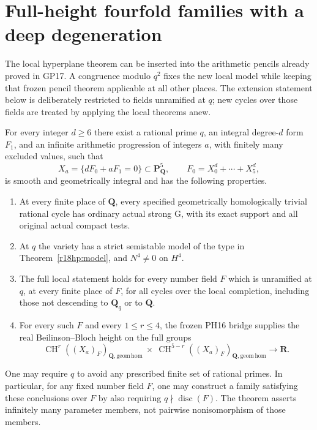 \section{Full-height fourfold families with a deep degeneration}
\label{r18gf:section}

The local hyperplane theorem can be inserted into the arithmetic
pencils already proved in GP17.  A congruence modulo $q^2$ fixes the
new local model while keeping that frozen pencil theorem applicable
at all other places.  The extension statement below is deliberately
restricted to fields unramified at $q$; new cycles over those fields
are treated by applying the local theorems anew.

\begin{theorem}
\label{r18gf:global}
For every integer $d\ge6$ there exist a rational prime $q$, an
integral degree-$d$ form $F_1$, and an infinite arithmetic progression
of integers $a$, with finitely many excluded values, such that
\[
 X_a=\{dF_0+aF_1=0\}\subset\mathbf P^5_{\mathbf Q},
 \qquad F_0=X_0^d+\cdots+X_5^d,
 \tag{GF18.1}\label{r18gf:family}
\]
is smooth and geometrically integral and has the following properties.
\begin{enumerate}
\item At every finite place of $\mathbf Q$, every specified
geometrically homologically trivial rational cycle has ordinary
actual strong G, with its exact support and all original actual
compact tests.
\item At $q$ the variety has a strict semistable model of the type
in Theorem~\ref{r18hp:model}, and $N^4\ne0$ on $H^4$.
\item The full local statement holds for every number field $F$
which is unramified at $q$, at every finite place of $F$, for all
cycles over the local completion, including those not descending
to $\mathbf Q_q$ or to $\mathbf Q$.
\item For every such $F$ and every $1\le r\le4$, the frozen PH16
bridge supplies the real Beilinson--Bloch height on the full groups
\[
 \operatorname{CH}^r((X_a)_F)_{\mathbf Q,\mathrm{geom\,hom}}
 \ \times\
 \operatorname{CH}^{5-r}((X_a)_F)_{\mathbf Q,\mathrm{geom\,hom}}
                         \longrightarrow\mathbf R.
 \tag{GF18.2}\label{r18gf:height}
\]
\end{enumerate}
One may require $q$ to avoid any prescribed finite set of rational
primes.  In particular, for any fixed number field $F$, one may
construct a family satisfying these conclusions over $F$ by also
requiring $q\nmid\operatorname{disc}(F)$.
The theorem asserts infinitely many parameter members, not pairwise
nonisomorphism of those members.
\end{theorem}

